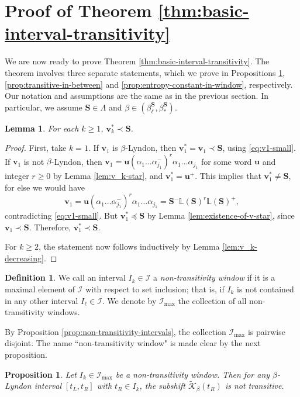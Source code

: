 \documentclass[11pt]{amsart}
\newtheorem{lemma}[theorem]{Lemma}
\newtheorem{proposition}[theorem]{Proposition}
\theoremstyle{definition}
\newtheorem{definition}[theorem]{Definition}
\theoremstyle{remark}
\numberwithin{equation}{section}
\renewcommand{\L}{\ensuremath{\mathbb{L}}}
\newcommand{\II}{\mathcal{I}}
\newcommand{\Kt}{\widetilde{\mathcal{K}}}
\newcommand{\cs}{ {\mathbf{S}}}
\renewcommand{\u}{\mathbf{u}}
\renewcommand{\v}{\mathbf{v}}
\newcommand{\al}{\alpha}
\newcommand{\lle}{\preccurlyeq}
\newcommand{\La}{\Lambda}
\begin{document}
\section{Proof of Theorem \ref{thm:basic-interval-transitivity}} \label{sec:basic-interval-proof}

We are now ready to prove Theorem \ref{thm:basic-interval-transitivity}. The theorem involves three separate statements, which we prove in Propositions \ref{prop:non-transitivity-window}, \ref{prop:transitive-in-between} and \ref{prop:entropy-constant-in-window}, respectively. Our notation and assumptions are the same as in the previous section. {In particular, we assume $\cs\in\La$ and $\beta\in(\beta_\ell^\cs,\beta_*^\cs)$.}

\begin{lemma} \label{v_k-star-less-than-s}
For each $k\geq 1$, $\v_k^*\prec \cs$.
\end{lemma}

\begin{proof}
First, take $k=1$. If $\v_1$ is $\beta$-Lyndon, then $\v_1^*=\v_1\prec \cs$, using \eqref{eq:v1-small}. If $\v_1$ is not $\beta$-Lyndon, then $\v_1=\u(\al_1\dots\al_{j_1}^-)^r\al_1\dots\al_{j_1}$ for some word $\u$ and integer $r\geq 0$ by Lemma \ref{lem:v_k-star}, and $\v_1^*=\u^+$. This implies that $\v_1^*\neq \cs$, for else we would have
\[
\v_1=\u(\al_1\dots\al_{j_1}^-)^r\al_1\dots\al_{j_1}=\cs^-\L(\cs)^r\L(\cs)^+,
\]
contradicting \eqref{eq:v1-small}. But $\v_1^*\lle \cs$ by Lemma \ref{lem:existence-of-v-star}, since $\v_1\prec\cs$. Therefore, $\v_1^*\prec \cs$.

For $k\geq 2$, the statement now follows inductively by Lemma \ref{lem:v_k-decreasing}.
\end{proof}

\begin{definition}
We call an interval $I_k\in\II$ a {\em non-transitivity window} if it is a maximal element of $\II$ with respect to set inclusion; that is, if $I_k$ is not contained in any other interval $I_\ell\in \II$. We denote by $\II_{\max}$ the collection of all non-transitivity windows.
\end{definition}

By Proposition \ref{prop:non-transitivity-intervals}, the collection $\II_{\max}$ is pairwise disjoint. The name ``non-transitivity window" is made clear by the next proposition.

\begin{proposition} \label{prop:non-transitivity-window}
Let $I_k\in\II_{\max}$ be a non-transitivity window. Then for any $\beta$-Lyndon interval $[t_L,t_R]$ with $t_R\in I_k$, the subshift $\Kt_\beta(t_R)$ is not transitive.
\end{proposition}
\end{document}
